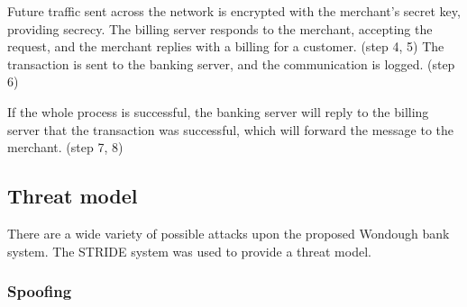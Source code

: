 Future traffic sent across the network is encrypted with the merchant's secret key, providing secrecy. The billing server responds to the merchant, accepting the request, and the merchant replies with a billing for a customer. (step 4, 5) The transaction is sent to the banking server, and the communication is logged. (step 6)

If the whole process is successful, the banking server will reply to the billing server that the transaction was successful, which will forward the message to the merchant. (step 7, 8)

\subsection{Threat model}

There are a wide variety of possible attacks upon the proposed Wondough bank system. The STRIDE system was used to provide a threat model.

\subsubsection{Spoofing}

